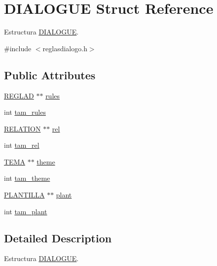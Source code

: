 \hypertarget{structDIALOGUE}{
\section{DIALOGUE Struct Reference}
\label{structDIALOGUE}
}


Estructura \hyperlink{structDIALOGUE}{DIALOGUE}.  




{\ttfamily \#include $<$reglasdialogo.h$>$}

\subsection*{Public Attributes}
\begin{DoxyCompactItemize}
\item 
\hyperlink{struct__regla}{REGLAD} $\ast$$\ast$ \hyperlink{structDIALOGUE_aa240a2acbaf76541f088ba497d374909}{rules}
\item 
int \hyperlink{structDIALOGUE_a4ea7611ebc3e72b35a4ce8b9a9203ca0}{tam\_\-rules}
\item 
\hyperlink{structRELATION}{RELATION} $\ast$$\ast$ \hyperlink{structDIALOGUE_aac56467fc2e1c4e06b9d99bf2777da3e}{rel}
\item 
int \hyperlink{structDIALOGUE_a3b4b15ee1d429c354646fe23be1441df}{tam\_\-rel}
\item 
\hyperlink{structTEMA}{TEMA} $\ast$$\ast$ \hyperlink{structDIALOGUE_ae0bc7a4bb9cbb877e2b94b394cab6d2f}{theme}
\item 
int \hyperlink{structDIALOGUE_a6487cf77205dc52c373bb40659c8f9cd}{tam\_\-theme}
\item 
\hyperlink{structPLANTILLA}{PLANTILLA} $\ast$$\ast$ \hyperlink{structDIALOGUE_a166bb11fea3701fb5f4530aa45c486db}{plant}
\item 
int \hyperlink{structDIALOGUE_a48bd62be46bf120d7206f1058bc8b87d}{tam\_\-plant}
\end{DoxyCompactItemize}


\subsection{Detailed Description}
Estructura \hyperlink{structDIALOGUE}{DIALOGUE}. 

